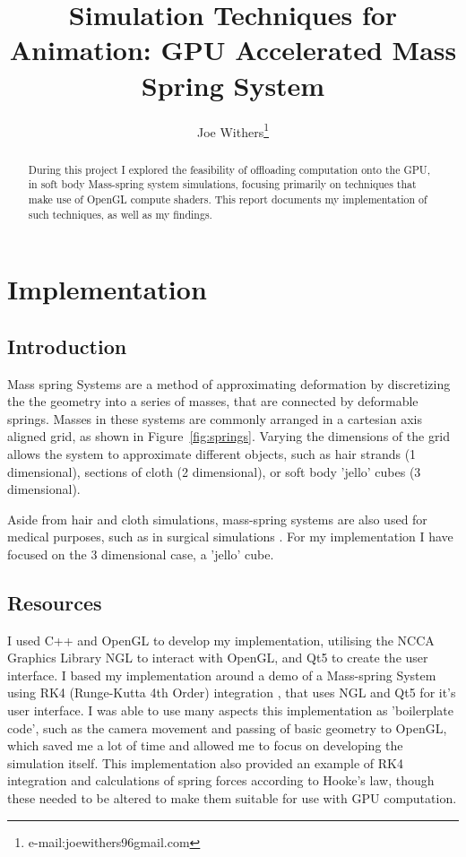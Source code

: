 \documentclass[]{acmsiggraph}
\title{Simulation Techniques for Animation: GPU Accelerated Mass Spring System}
\author{Joe Withers\thanks{e-mail:joewithers96gmail.com}}
\begin{document}

\maketitle

\begin{abstract}
During this project I explored the feasibility of offloading computation onto the GPU, in soft body Mass-spring system simulations, focusing primarily on techniques that make use of OpenGL compute shaders. This report documents my implementation of such techniques, as well as my findings.
\end{abstract}


\section{Implementation} \label{sec:implementation}

\subsection{Introduction}

Mass spring Systems are a method of approximating deformation by discretizing the the geometry into a series of masses, that are connected by deformable springs. Masses in these systems are commonly arranged in a cartesian axis aligned grid, as shown in Figure~\ref{fig:springs}. Varying the dimensions of the grid allows the system to approximate different objects, such as hair strands (1 dimensional), sections of cloth (2 dimensional), or soft body 'jello' cubes (3 dimensional).

Aside from hair and cloth simulations, mass-spring systems are also used for medical purposes, such as in surgical simulations \cite{surgical}. For my implementation I have focused on the 3 dimensional case, a 'jello' cube.

\subsection{Resources}
I used C++ and OpenGL to develop my implementation, utilising the NCCA Graphics Library NGL \cite{ngl} to interact with OpenGL, and Qt5 to create the user interface. I based my implementation around a demo of a Mass-spring System using RK4 (Runge-Kutta 4th Order) integration \cite{nglMassSpring}, that uses NGL and Qt5 for it's user interface. I was able to use many aspects this implementation as 'boilerplate code', such as the camera movement and passing of basic geometry to OpenGL, which saved me a lot of time and allowed me to focus on developing the simulation itself. This implementation also provided an example of RK4 integration and calculations of spring forces according to Hooke's law, though these needed to be altered to make them suitable for use with GPU computation.
\end{document}
